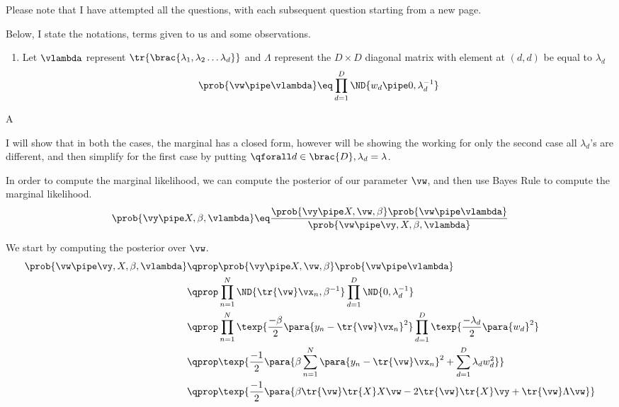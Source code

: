 \documentclass{article}
\begin{document}
\makeheader

Please note that I have attempted all the questions, with each subsequent question starting from a new page.

\begin{question}

	Below, I state the notations, terms given to us and some observations.

	\begin{enumerate}[label=\bt{\theenumi.}]
		\ditem[Likelihood]
			\begin{align*}
				\prob{\vy \pipe X, \vw, \beta}	\eq	\prod_{n = 1}^N \ND{y_n \pipe \tr{\vw} \vx_n, \beta^{-1}}
			\end{align*}
		\item Let $\vlambda$ represent $\tr{\brac{\lambda_1, \lambda_2 \dots \lambda_d}}$ and $\Lambda$ represent the $D \times D$ diagonal matrix with element at $(d, d)$ be equal to $\lambda_d$
		\ditem[Prior]
			\begin{align*}
				\prob{\vw \pipe \vlambda}	\eq	\prod_{d = 1}^D \ND{w_d \pipe 0, \lambda_d^{-1}}
			\end{align*}
	\end{enumerate}

	\begin{qpart}{A}

		I will show that in both the cases, the marginal has a closed form, however will be showing the working for only the second case \ie all $\lambda_d$'s are different, and then simplify for the first case by putting $\qforall d \in \brac{D}, \lambda_d = \lambda$.

		In order to compute the marginal likelihood, we can compute the posterior of our parameter \ie $\vw$, and then use Bayes Rule to compute the marginal likelihood.
		\begin{equation}
			\prob{\vy \pipe X, \beta, \vlambda}	\eq	\frac{\prob{\vy \pipe X, \vw, \beta} \prob{\vw \pipe \vlambda}}{\prob{\vw \pipe \vy, X, \beta, \vlambda}}
			\label{eq:q1-bayes}
		\end{equation}

		We start by computing the posterior over $\vw$.
		\begin{align*}
			\prob{\vw \pipe \vy, X, \beta, \vlambda}	&\qprop	\prob{\vy \pipe X, \vw, \beta} \prob{\vw \pipe \vlambda} \\
			&\qprop	\prod_{n = 1}^N \ND{\tr{\vw} \vx_n, \beta^{-1}} \prod_{d = 1}^D \ND{0, \lambda_d^{-1}} \\
			&\qprop \prod_{n = 1}^N \texp{\frac{-\beta}{2} \para{y_n - \tr{\vw} \vx_n}^2} \prod_{d = 1}^D \texp{\frac{-\lambda_d}{2} \para{w_d}^2} \\
			&\qprop \texp{\frac{-1}{2} \para{ \beta \sum_{n = 1}^N \para{y_n - \tr{\vw} \vx_n}^2 + \sum_{d = 1}^D \lambda_d w_d^2}} \\
			&\qprop	\texp{\frac{-1}{2} \para{\beta \tr{\vw} \tr{X} X \vw - 2 \tr{\vw} \tr{X} \vy + \tr{\vw} \Lambda \vw}}
		\end{align*}


\end{qpart}
\end{question}
\end{document}
